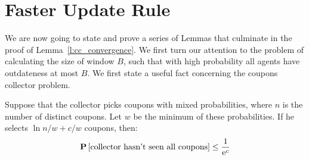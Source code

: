 \section{Faster Update Rule}\label{app:s:cc_convergence}
We are now going to state and prove a series of Lemmas that culminate in 
the proof of Lemma~\ref{l:cc_convergence}. We first turn our attention to
the problem of calculating the size of window $B$, such that with high probability
all agents have outdateness at most $B$. 
We first state a useful fact concerning the coupons collector problem.

\begin{lemma}\label{l:coupons_lemma}
Suppose that the collector picks coupons with mixed 
probabilities, where $n$ is the number of distinct coupons.
Let $w$ be the minimum of these probabilities. 
If he selects $\ln n/w+ c/w$ coupons, then:
$$
\bm{\mathrm{P}}\left[\text{collector hasn't seen all coupons}\right] \leq \frac{1}{\mathrm{e}^c}
$$
\end{lemma}

